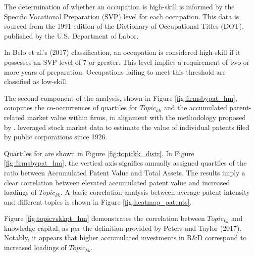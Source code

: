 \documentclass[12pt, letterpaper]{article}
\begin{document}
The determination of whether an occupation is high-skill is informed by the Specific Vocational Preparation (SVP) level for each occupation. This data is sourced from the 1991 edition of the Dictionary of Occupational Titles (DOT), published by the U.S. Department of Labor. 

In Belo et al.'s (2017) classification, an occupation is considered high-skill if it possesses an SVP level of 7 or greater. This level implies a requirement of two or more years of preparation. Occupations failing to meet this threshold are classified as low-skill.


The second component of the analysis, shown in Figure \ref{fig:firmsbypat_hm}, computes the co-occurrences of quartiles for $Topic_{kk}$ and the accumulated patent-related market value within firms, in alignment with the methodology proposed by \cite{Kogan2017-fx}. \cite{Kogan2017-fx} leveraged stock market data to estimate the value of individual patents filed by public corporations since 1926. 

 Quartiles for \tkk are shown in Figure \ref{fig:topickk_distr}. In Figure \ref{fig:firmsbypat_hm}, the vertical axis signifies annually assigned quartiles of the ratio between Accumulated Patent Value and Total Assets. The results imply a clear correlation between elevated accumulated patent value and increased loadings of $Topic_{kk}$. A basic correlation analysis between average patent intensity and different topics is shown in Figure \ref{fig:heatmap_patents}.




Figure \ref{fig:topicvskkpt_hm} demonstrates the correlation between $Topic_{kk}$ and knowledge capital, as per the definition provided by Peters and Taylor (2017). Notably, it appears that higher accumulated investments in R\&D correspond to increased loadings of $Topic_{kk}$. 

\end{document}
